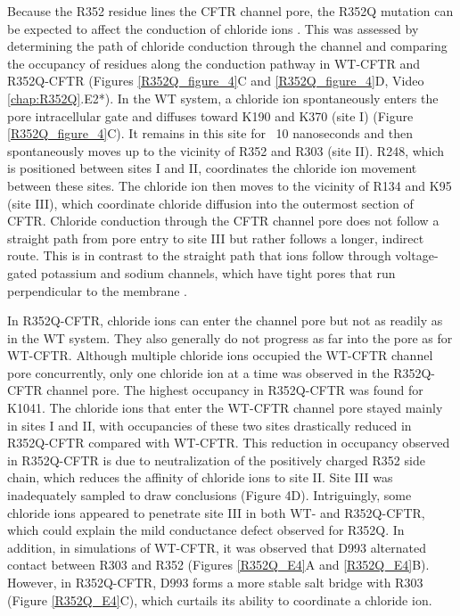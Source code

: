Because the R352 residue lines the CFTR channel pore, the R352Q mutation can be expected to affect the conduction of chloride ions \cite{zhang2018}. This was assessed by determining the path of chloride conduction through the channel and comparing the occupancy of residues along the conduction pathway in WT-CFTR and R352Q-CFTR (Figures \ref{R352Q_figure_4}C and \ref{R352Q_figure_4}D, Video \ref{chap:R352Q}.E2*). In the WT system, a chloride ion spontaneously enters the pore intracellular gate \cite{linsdell2018} and diffuses toward K190 and K370 (site I) (Figure \ref{R352Q_figure_4}C). It remains in this site for ~10 nanoseconds and then spontaneously moves up to the vicinity of R352 and R303 (site II). R248, which is positioned between sites I and II, coordinates the chloride ion movement between these sites. The chloride ion then moves to the vicinity of R134 and K95 (site III), which coordinate chloride diffusion into the outermost section of CFTR. Chloride conduction through the CFTR channel pore does not follow a straight path from pore entry to site III but rather follows a longer, indirect route. This is in contrast to the straight path that ions follow through voltage-gated potassium and sodium channels, which have tight pores that run perpendicular to the membrane \cite{flood2019}.

In R352Q-CFTR, chloride ions can enter the channel pore but not as readily as in the WT system. They also generally do not progress as far into the pore as for WT-CFTR. Although multiple chloride ions occupied the WT-CFTR channel pore concurrently, only one chloride ion at a time was observed in the R352Q-CFTR channel pore. The highest occupancy in R352Q-CFTR was found for K1041. The chloride ions that enter the WT-CFTR channel pore stayed mainly in sites I and II, with occupancies of these two sites drastically reduced in R352Q-CFTR compared with WT-CFTR. This reduction in occupancy observed in R352Q-CFTR is due to neutralization of the positively charged R352 side chain, which reduces the affinity of chloride ions to site II. Site III was inadequately sampled to draw conclusions (Figure 4D). Intriguingly, some chloride ions appeared to penetrate site III in both WT- and R352Q-CFTR, which could explain the mild conductance defect observed for R352Q. In addition, in simulations of WT-CFTR, it was observed that D993 alternated contact between R303 and R352 (Figures \ref{R352Q_E4}A and \ref{R352Q_E4}B). However, in R352Q-CFTR, D993 forms a more stable salt bridge with R303 (Figure \ref{R352Q_E4}C), which curtails its ability to coordinate a chloride ion.

